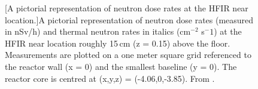 \begin{figure}[!h]
\begin{minipage}{.45\textwidth}
  [A pictorial representation of neutron dose rates at the HFIR near location.]{A pictorial representation of neutron dose rates (measured in nSv/h) and thermal neutron rates in italics (cm$^{-2}$ s${^-1}$) at the HFIR near location roughly 15\,cm (z = 0.15) above the floor. Measurements are plotted on a one meter square grid referenced to the reactor wall (x = 0) and the smallest baseline (y = 0). The reactor core is centred at (x,y,z) = (-4.06,0,-3.85). From \cite{Ashenfelter_2016}.}
  \label{fig:prospectNeutronMap}
\end{minipage}
\end{figure}


